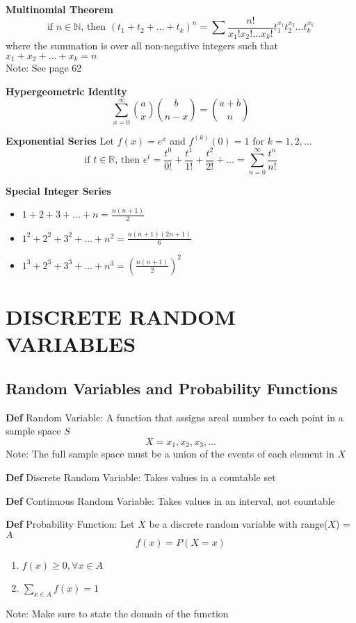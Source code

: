 \documentclass[11pt,notitlepage]{report}
\begin{document}
\textbf{Multinomial Theorem}
$$\text{if $n \in \mathbb N$, then }(t_1 + t_2 + \dots + t_k)^n = \sum \frac{n!}{x_1!x_2!\dots x_k!}t_1^{x_1}t_2^{x_2} \dots t_k^{x_k}$$
where the summation is over all non-negative integers such that $x_1 + x_2 + \dots + x_k = n$\\
\hspace*{5mm} Note: See page 62

\textbf{Hypergeometric Identity}
$$\sum_{x=0}^\infty \binom{a}{x}\binom{b}{n-x}=\binom{a+b}{n}$$

\textbf{Exponential Series} Let $f(x) = e^x$ and $f^{(k)}(0) = 1$ for $k = 1, 2, \dots$
$$\text{if $t \in \mathbb R$, then }e^t = \frac{t^0}{0!} + \frac{t^1}{1!} + \frac{t^2}{2!} + \dots = \sum_{n=0}^{\infty} \frac{t^n}{n!}$$

\textbf{Special Integer Series}
\begin{itemize}
    \item $1 + 2 + 3 + \dots + n = \frac{n(n+1)}{2}$
    \item $1^2 + 2^2 + 3^2 + \dots + n^2 = \frac{n(n+1)(2n+1)}{6}$
    \item $1^3 + 2^3 + 3^3 + \dots + n^3 = \left(\frac{n(n+1)}{2}\right)^2$
\end{itemize}


\chapter{DISCRETE RANDOM VARIABLES}

\section{Random Variables and Probability Functions}


\textbf{Def} Random Variable: A function that assigns  areal number to each point in a sample space $S$
$$X = x_1, x_2, x_3, \dots$$
\hspace*{5mm} Note: The full sample space must be a union of the events of each element in $X$

\textbf{Def} Discrete Random Variable: Takes values in a countable set

\textbf{Def} Continuous Random Variable: Takes values in an interval, not countable

\textbf{Def} Probability Function: Let $X$ be a discrete random variable with range($X$) = $A$
$$f(x) = P(X = x)$$
\begin{enumerate}
    \item $f(x) \geq 0, \forall x \in A$
    \item $\sum_{x\in A} f(x) = 1$
\end{enumerate}
\hspace*{5mm} Note: Make sure to state the domain of the function
\end{document}
